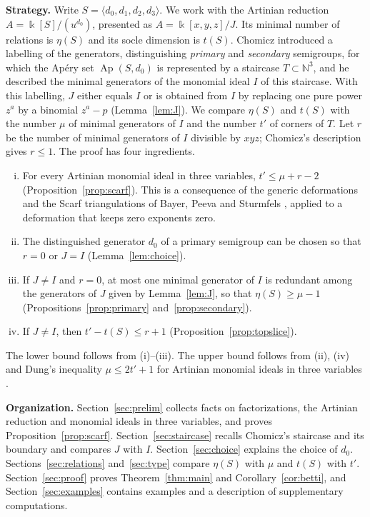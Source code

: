 \documentclass{amsart}
\theoremstyle{definition}
\theoremstyle{remark}
\numberwithin{equation}{section}
\newcommand{\N}{\mathbb{N}}
\newcommand{\kk}{\Bbbk}
\newcommand{\Ap}{\operatorname{Ap}}
\newcommand{\Apd}{\Ap(S,d_0)}
\begin{document}
\medskip\noindent\textbf{Strategy.} Write $S=\langle d_0,d_1,d_2,d_3\rangle$. We work with the Artinian reduction $A=\kk[S]/(u^{d_0})$, presented as $A=\kk[x,y,z]/J$. Its minimal number of relations is $\eta(S)$ and its socle dimension is $t(S)$. Chomicz \cite{Cho26} introduced a labelling of the generators, distinguishing \emph{primary} and \emph{secondary} semigroups, for which the Ap\'ery set $\Apd$ is represented by a staircase $T\subset\N^3$, and he described the minimal generators of the monomial ideal $I$ of this staircase. With this labelling, $J$ either equals $I$ or is obtained from $I$ by replacing one pure power $z^a$ by a binomial $z^a-p$ (Lemma~\ref{lem:J}). We compare $\eta(S)$ and $t(S)$ with the number $\mu$ of minimal generators of $I$ and the number $t'$ of corners of $T$. Let $r$ be the number of minimal generators of $I$ divisible by $xyz$; Chomicz's description gives $r\le1$. The proof has four ingredients.
\begin{enumerate}[(i)]
\item For every Artinian monomial ideal in three variables, $t'\le\mu+r-2$ (Proposition~\ref{prop:scarf}). This is a consequence of the generic deformations and the Scarf triangulations of Bayer, Peeva and Sturmfels \cite{BPS98}, applied to a deformation that keeps zero exponents zero.
\item The distinguished generator $d_0$ of a primary semigroup can be chosen so that $r=0$ or $J=I$ (Lemma~\ref{lem:choice}).
\item If $J\neq I$ and $r=0$, at most one minimal generator of $I$ is redundant among the generators of $J$ given by Lemma~\ref{lem:J}, so that $\eta(S)\ge\mu-1$ (Propositions~\ref{prop:primary} and~\ref{prop:secondary}).
\item If $J\ne I$, then $t'-t(S)\le r+1$ (Proposition~\ref{prop:topslice}).
\end{enumerate}
The lower bound follows from (i)--(iii). The upper bound follows from (ii), (iv) and Dung's inequality $\mu\le 2t'+1$ for Artinian monomial ideals in three variables \cite[Theorem~3.2]{Dun18}.

\medskip\noindent\textbf{Organization.} Section~\ref{sec:prelim} collects facts on factorizations, the Artinian reduction and monomial ideals in three variables, and proves Proposition~\ref{prop:scarf}. Section~\ref{sec:staircase} recalls Chomicz's staircase and its boundary and compares $J$ with $I$. Section~\ref{sec:choice} explains the choice of $d_0$. Sections~\ref{sec:relations} and~\ref{sec:type} compare $\eta(S)$ with $\mu$ and $t(S)$ with $t'$. Section~\ref{sec:proof} proves Theorem~\ref{thm:main} and Corollary~\ref{cor:betti}, and Section~\ref{sec:examples} contains examples and a description of supplementary computations.
\end{document}
